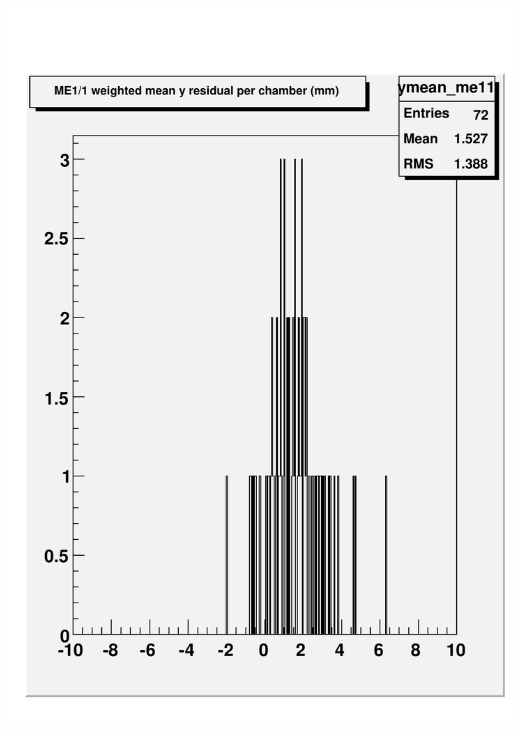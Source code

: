 \documentclass[compress]{beamer}
\begin{document}
\begin{frame}
\begin{columns}
\includegraphics[width=0.7\linewidth]{talk_me11_ymean_207.pdf}
\end{columns}
\end{frame}
\end{document}
